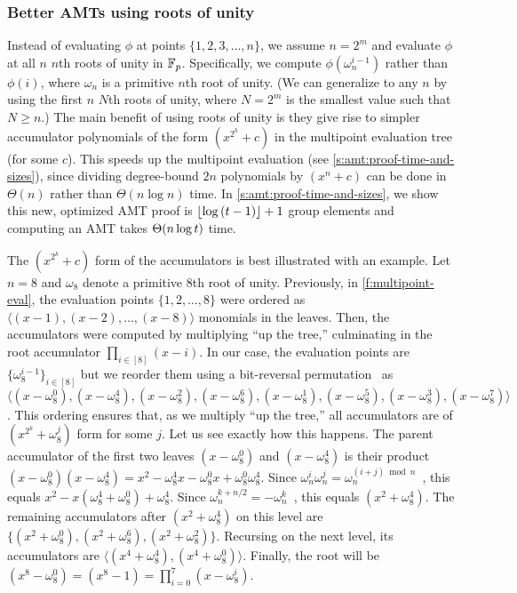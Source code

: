 \subsubsection{Better AMTs using roots of unity}
\label{s:amt:roots-of-unity}
Instead of evaluating $\phi$ at points $\{1,2,3,\dots,n\}$, we assume $n=2^m$ and evaluate $\phi$ at all $n$ $n$th roots of unity in $\mathbb{F}_p$.
Specifically, we compute $\phi(\omega_n^{i-1})$ rather than $\phi(i)$, where $\omega_n$ is a primitive $n$th root of unity.
(We can generalize to any $n$ by using the first $n$ $N$th roots of unity, where $N=2^m$ is the smallest value such that $N\ge n$.)
The main benefit of using roots of unity is they give rise to simpler accumulator polynomials of the form $(x^{2^k} + c)$ in the multipoint evaluation tree (for some $c$).
This speeds up the multipoint evaluation (see \cref{s:amt:proof-time-and-sizes}), since dividing degree-bound $2n$ polynomials by $(x^n + c)$ can be done in $\Theta(n)$ rather than $\Theta(n\log{n})$ time.
In \cref{s:amt:proof-time-and-sizes}, we show this new, optimized AMT proof is $\lfloor\log{(t-1)}\rfloor + 1$ group elements and computing an AMT takes $\Theta(n\log{t})$ time.

The $(x^{2^k} + c)$ form of the accumulators is best illustrated with an example.
Let $n=8$ and $\omega_8$ denote a primitive 8th root of unity.
Previously, in \cref{f:multipoint-eval}, the evaluation points $\{1,2,\dots,8\}$ were ordered as $\langle (x-1), (x-2),\dots, (x-8)\rangle$ monomials in the leaves.
Then, the accumulators were computed by multiplying ``up the tree,'' culminating in the root accumulator $\prod_{i\in[8]}(x-i)$.
In our case, the evaluation points are $\{\omega_8^{i-1}\}_{i\in[8]}$ but we reorder them using a bit-reversal permutation~\cite{bitreversal-wiki} as $\langle(x-\omega_8^0), (x-\omega_8^4), (x-\omega_8^2), (x-\omega_8^6), (x-\omega_8^1), (x-\omega_8^5), (x-\omega_8^3), (x-\omega_8^7)\rangle$.
This ordering ensures that, as we multiply ``up the tree,'' all accumulators are of $(x^{2^k} + \omega_8^j)$ form for some $j$.
Let us see exactly how this happens.
The parent accumulator of the first two leaves $(x-\omega_8^0)$ and $(x-\omega_8^4)$ is their product $(x-\omega_8^0)(x-\omega_8^4) = x^2 - \omega_8^4 x - \omega_8^0 x + \omega_8^0 \omega_8^4$.
Since $\omega_n^i \omega_n^j = \omega_n^{(i+j) \bmod n}$~\cite{CLRS09}, this equals $x^2 - x(\omega_8^4 + \omega_8^0) + \omega_8^4$.
Since $\omega_n^{k+n/2} = -\omega_n^k$~\cite{CLRS09}, this equals $(x^2 + \omega_8^4)$.
The remaining accumulators after $(x^2 + \omega_8^4)$ on this level are $\{(x^2 + \omega_8^0), (x^2 + \omega_8^6), (x^2 + \omega_8^2)\}$.
Recursing on the next level, its accumulators are $\langle(x^4 + \omega_8^4),(x^4 + \omega_8^0)\rangle$.
Finally, the root will be $(x^8-\omega_8^0) = (x^8 - 1) = \prod_{i=0}^{7}(x-\omega_8^i)$.

